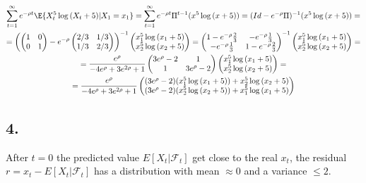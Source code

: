 \begin{gather*}
    \sum_{t=1}^\infty e^{-\rho t} \E{X_t^5 \log{(X_t+5)} | X_1=x_1} = \sum_{t=1}^\infty e^{-\rho t} \Pi^{t-1} (x^5\log{(x+5)}) = (Id-e^{-\rho}\Pi)^{-1}(x^5\log{(x+5)})= \\
    = \left(
    \begin{pmatrix}
    1 & 0 \\ 
    0 & 1
    \end{pmatrix} - e^{-\rho} 
    \begin{pmatrix}
    2/3 & 1/3 \\
    1/3 & 2/3
    \end{pmatrix} \right ) ^{-1}
    \begin{pmatrix}
    x_1^5\log{(x_1+5)}  \\
    x_2^5\log{(x_2+5)}
    \end{pmatrix} =
    \begin{pmatrix}
    1-e^{-\rho}\frac{2}{3} & -e^{-\rho}\frac{1}{3} \\
    -e^{-\rho}\frac{1}{3} & 1-e^{-\rho}\frac{2}{3}
    \end{pmatrix} ^{-1} \begin{pmatrix}
    x_1^5\log{(x_1+5)}  \\
    x_2^5\log{(x_2+5)}
    \end{pmatrix}= \\
    =\frac{e^\rho}{-4 e^\rho + 3 e^{2\rho} + 1}
    \begin{pmatrix}
    3 e^\rho - 2 & 1 \\
    1 &3 e^\rho - 2
    \end{pmatrix}
    \begin{pmatrix}
    x_1^5\log{(x_1+5)}  \\
    x_2^5\log{(x_2+5)}
    \end{pmatrix}= \\
    = \frac{e^\rho}{-4 e^\rho + 3 e^{2\rho} + 1} \begin{pmatrix}
    (3 e^\rho - 2)(x_1^5\log{(x_1+5))}+ x_2^5\log{(x_2+5) }\\
    (3 e^\rho - 2)(x_2^5\log{(x_2+5))}+ x_1^5\log{(x_1+5)}
    \end{pmatrix}
\end{gather*}

\subsection*{4.}
After $t=0$ the predicted value $E[X_{t}|\mathcal{F}_{t}]$ get close to the real $x_t$, the residual $r=x_t - E[X_{t}|\mathcal{F}_{t}]$ has a distribution with mean $\approx 0$ and a variance $\leq 2$.

